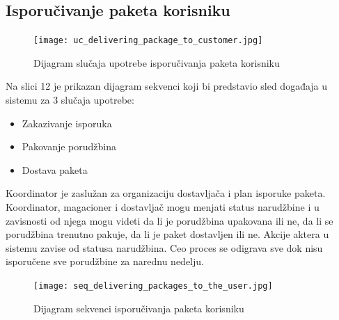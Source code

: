\subsection{Isporučivanje paketa korisniku}
\begin{figure}[H]
	\begin{center}
		\texttt{[image: uc\_delivering\_package\_to\_customer.jpg]}
	\end{center}
    \caption{Dijagram slučaja upotrebe isporučivanja paketa korisniku}
\end{figure}

Na slici 12 je prikazan dijagram sekvenci koji bi predstavio sled događaja u sistemu za 3 slučaja upotrebe: 
\begin{itemize}
	\item{Zakazivanje isporuka}
	\item{Pakovanje porudžbina }
	\item{Dostava paketa}
\end{itemize}

Koordinator je zaslužan za organizaciju dostavljača i plan isporuke paketa. Koordinator, magacioner i dostavljač mogu menjati status narudžbine i u zavisnosti od njega mogu videti da li je porudžbina upakovana ili ne, da li se porudžbina trenutno pakuje, da li je paket dostavljen ili ne. Akcije aktera u sistemu zavise od statusa narudžbina. Ceo proces se odigrava sve dok nisu isporučene sve porudžbine za narednu nedelju.
\begin{figure}[H]
	\begin{center}
		\texttt{[image: seq\_delivering\_packages\_to\_the\_user.jpg]}
	\end{center}
    \caption{Dijagram sekvenci isporučivanja paketa korisniku}
\end{figure}




